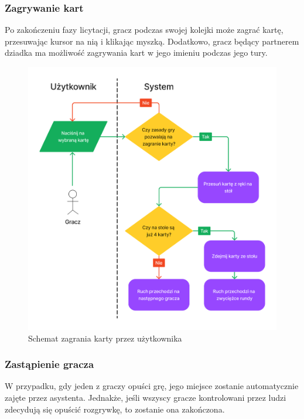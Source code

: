 \FloatBarrier

\subsubsection{Zagrywanie kart}

Po zakończeniu fazy licytacji, gracz podczas swojej kolejki może zagrać kartę,
przesuwając kursor na nią i klikając myszką. Dodatkowo, gracz będący partnerem dziadka
ma możliwość zagrywania kart w jego imieniu podczas jego tury.


\begin{figure}[h]
  \centering
  \includegraphics[width=\textwidth]{img/schematy/play_card.png}
  \caption{Schemat zagrania karty przez użytkownika}
\end{figure}

\FloatBarrier

\subsubsection{Zastąpienie gracza}
W przypadku, gdy jeden z graczy opuści grę, jego miejsce zostanie automatycznie
zajęte przez asystenta. Jednakże, jeśli wszyscy gracze kontrolowani przez ludzi
zdecydują się opuścić rozgrywkę, to zostanie ona zakończona.

